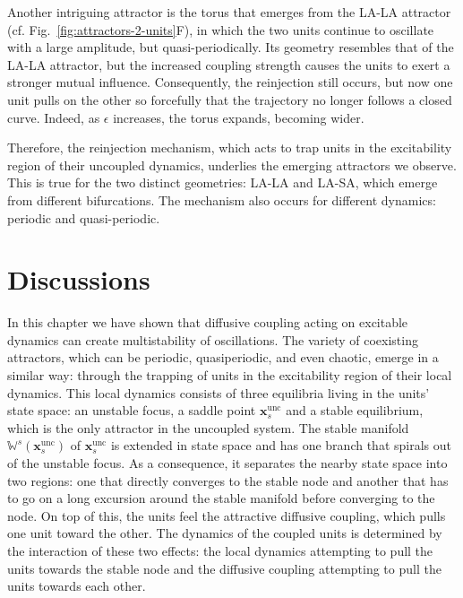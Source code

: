Another intriguing attractor is the torus that emerges from the LA-LA attractor (cf. Fig.~\ref{fig:attractors-2-units}F), in which the two units continue to oscillate with a large amplitude, but quasi-periodically. Its geometry resembles that of the LA-LA attractor, but the increased coupling strength causes the units to exert a stronger mutual influence. Consequently, the reinjection still occurs, but now one unit pulls on the other so forcefully that the trajectory no longer follows a closed curve. Indeed, as $\epsilon$ increases, the torus expands, becoming wider.

Therefore, the reinjection mechanism, which acts to trap units in the excitability region of their uncoupled dynamics, underlies the emerging attractors we observe. This is true for the two distinct geometries: LA-LA and LA-SA, which emerge from different bifurcations. The mechanism also occurs for different dynamics: periodic and quasi-periodic.

\section{Discussions}\label{sec:discussions}
In this chapter we have shown that diffusive coupling acting on excitable dynamics can create multistability of oscillations. The variety of coexisting attractors, which can be periodic, quasiperiodic, and even chaotic, emerge in a similar way: through the trapping of units in the excitability region of their local dynamics. This local dynamics consists of three equilibria living in the units' state space: an unstable focus, a saddle point $\mathbf{x}_s^\mathrm{unc}$ and a stable equilibrium, which is the only attractor in the uncoupled system. The stable manifold $\mathbb{W}^s(\mathbf{x}_s^\mathrm{unc})$ of $\mathbf{x}_s^\mathrm{unc}$ is extended in state space and has one branch that spirals out of the unstable focus. As a consequence, it separates the nearby state space into two regions: one that directly converges to the stable node and another that has to go on a long excursion around the stable manifold before converging to the node. On top of this, the units feel the attractive diffusive coupling, which pulls one unit toward the other. The dynamics of the coupled units is determined by the interaction of these two effects: the local dynamics attempting to pull the units towards the stable node and the diffusive coupling attempting to pull the units towards each other.

